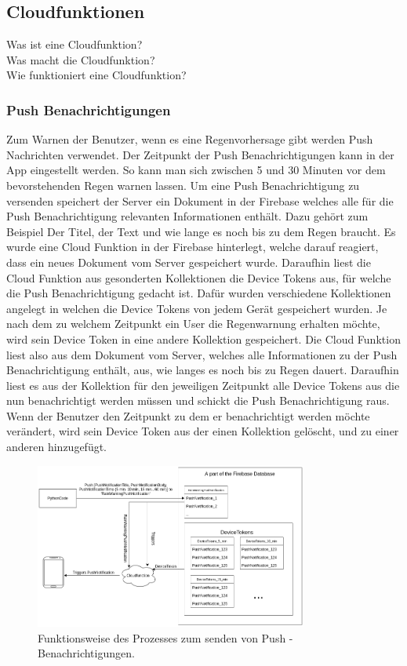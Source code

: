 \subsection{Cloudfunktionen}
Was ist eine Cloudfunktion? \\
Was macht die Cloudfunktion? \\
Wie funktioniert eine Cloudfunktion? \\

\subsubsection{Push Benachrichtigungen}
Zum Warnen der Benutzer, wenn es eine Regenvorhersage gibt werden Push Nachrichten verwendet. Der Zeitpunkt der Push Benachrichtigungen kann in der App eingestellt werden. So kann man sich zwischen 5 und 30 Minuten vor dem bevorstehenden Regen warnen lassen.  
Um eine Push Benachrichtigung zu versenden speichert der Server ein Dokument in der Firebase welches alle für die Push Benachrichtigung relevanten Informationen enthält. Dazu gehört zum Beispiel Der Titel, der Text und wie lange es noch bis zu dem Regen braucht.   
Es wurde eine Cloud Funktion in der Firebase hinterlegt, welche darauf reagiert, dass ein neues Dokument vom Server gespeichert wurde. Daraufhin liest die Cloud Funktion aus gesonderten Kollektionen die Device Tokens aus, für welche die Push Benachrichtigung gedacht ist.   
Dafür wurden verschiedene Kollektionen angelegt in welchen die Device Tokens von jedem Gerät gespeichert wurden. Je nach dem zu welchem Zeitpunkt ein User die Regenwarnung erhalten möchte, wird sein Device Token in eine andere Kollektion gespeichert.   
Die Cloud Funktion liest also aus dem Dokument vom Server, welches alle Informationen zu der Push Benachrichtigung enthält, aus, wie langes es noch bis zu Regen dauert. Daraufhin liest es aus der Kollektion für den jeweiligen Zeitpunkt alle Device Tokens aus die nun benachrichtigt werden müssen und schickt die Push Benachrichtigung raus.   
Wenn der Benutzer den Zeitpunkt zu dem er benachrichtigt werden möchte verändert, wird sein Device Token aus der einen Kollektion gelöscht, und zu einer anderen hinzugefügt.

\begin{figure}[h]
 \centering
 \includegraphics[width=0.8\textwidth,angle=0]{abb/funktionsweise_pushnachrichten_senden}
 \caption[Funktionsweise von Pushbenachrichtigungen]{Funktionsweise des Prozesses zum senden von Push - Benachrichtigungen.}
\label{fig:funktionsweise_pushnachrichten_senden}
\end{figure}

